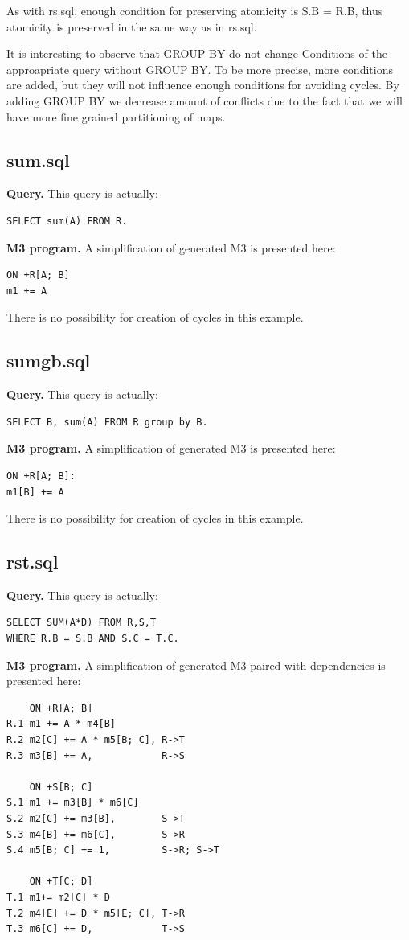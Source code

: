 \documentclass{sig-semester}
\begin{document}
As with rs.sql, enough condition for preserving atomicity is S.B = R.B, thus atomicity is preserved in the same way as in rs.sql.

It is interesting to observe that GROUP BY do not change Conditions of the approapriate query without GROUP BY. To be more precise, more conditions are added, but they will not influence enough conditions for avoiding cycles. By adding GROUP BY we decrease amount of conflicts due to the fact that we will have more fine grained partitioning of maps.

\subsection{sum.sql}
\textbf{Query.} This query is actually:
\begin{verbatim}
SELECT sum(A) FROM R.
\end{verbatim}

\textbf{M3 program.} A simplification of generated M3 is presented here:
\begin{verbatim}
ON +R[A; B]
m1 += A
\end{verbatim}

There is no possibility for creation of cycles in this example.

\subsection{sumgb.sql}
\textbf{Query.} This query is actually:
\begin{verbatim}
SELECT B, sum(A) FROM R group by B.
\end{verbatim}

\textbf{M3 program.} A simplification of generated M3 is presented here:
\begin{verbatim}
ON +R[A; B]:
m1[B] += A
\end{verbatim}

There is no possibility for creation of cycles in this example.

\subsection{rst.sql}
\textbf{Query.} This query is actually:
\begin{verbatim}
SELECT SUM(A*D) FROM R,S,T 
WHERE R.B = S.B AND S.C = T.C.
\end{verbatim}

\textbf{M3 program.} A simplification of generated M3 paired with dependencies is presented here:
\begin{verbatim}
    ON +R[A; B]
R.1 m1 += A * m4[B]
R.2 m2[C] += A * m5[B; C], R->T
R.3 m3[B] += A,            R->S

    ON +S[B; C] 
S.1 m1 += m3[B] * m6[C]
S.2 m2[C] += m3[B],        S->T
S.3 m4[B] += m6[C],        S->R
S.4 m5[B; C] += 1,         S->R; S->T

    ON +T[C; D]
T.1 m1+= m2[C] * D
T.2 m4[E] += D * m5[E; C], T->R
T.3 m6[C] += D,            T->S
\end{verbatim}
\end{document}
